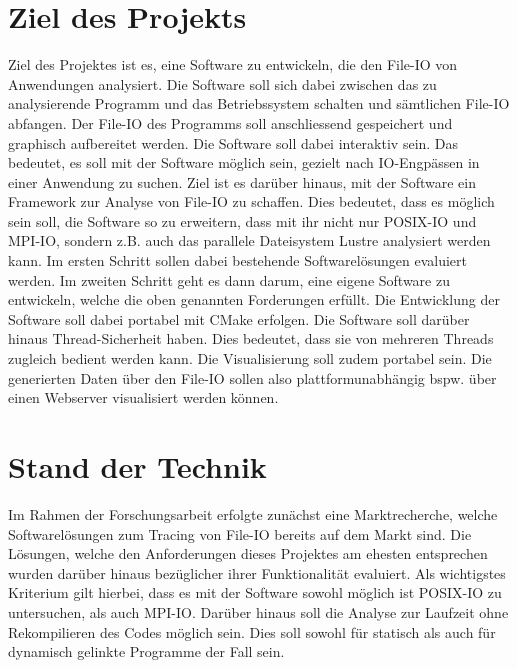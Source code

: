 
\chapter{Ziel des Projekts}
\label{sec:grundl}
Ziel des Projektes ist es, eine Software zu entwickeln, die den File-IO von Anwendungen analysiert. Die Software soll sich dabei zwischen das zu analysierende Programm und das Betriebssystem schalten und s\"amtlichen File-IO abfangen. Der File-IO des Programms soll anschliessend gespeichert und graphisch aufbereitet werden. Die Software soll dabei interaktiv sein. Das bedeutet, es soll mit der Software m\"oglich sein, gezielt nach IO-Engp\"assen in einer Anwendung zu suchen.\newline\newline
Ziel ist es dar\"uber hinaus, mit der Software ein Framework zur Analyse von File-IO zu schaffen. Dies bedeutet, dass es m\"oglich sein soll, die Software so zu erweitern, dass mit ihr nicht nur POSIX-IO und MPI-IO, sondern z.B. auch das parallele Dateisystem Lustre analysiert werden kann.\newline\newline
Im ersten Schritt sollen dabei bestehende Softwarel\"osungen evaluiert werden. Im zweiten Schritt geht es dann darum, eine eigene Software zu entwickeln, welche die oben genannten Forderungen erf\"ullt. Die Entwicklung der Software soll dabei portabel mit CMake erfolgen. Die Software soll dar\"uber hinaus Thread-Sicherheit haben. Dies bedeutet, dass sie von mehreren Threads zugleich bedient werden kann. Die Visualisierung soll zudem portabel sein. Die generierten Daten \"uber den File-IO sollen also plattformunabh\"angig bspw. \"uber einen Webserver visualisiert werden k\"onnen.

\chapter{Stand der Technik}
\label{sec:tech}
Im Rahmen der Forschungsarbeit erfolgte zun\"achst eine Marktrecherche, welche Softwarel\"osungen zum Tracing von File-IO bereits auf dem Markt sind. Die L\"osungen, welche den Anforderungen dieses Projektes am ehesten entsprechen wurden dar\"uber hinaus bez\"uglicher ihrer Funktionalit\"at evaluiert. Als wichtigstes Kriterium gilt hierbei, dass es mit der Software sowohl m\"oglich ist POSIX-IO zu untersuchen, als auch MPI-IO. Dar\"uber hinaus soll die Analyse zur Laufzeit ohne Rekompilieren des Codes m\"oglich sein. Dies soll sowohl f\"ur statisch als auch f\"ur dynamisch gelinkte Programme der Fall sein.
